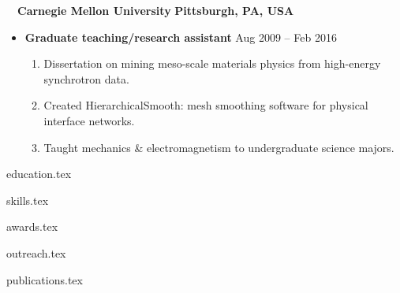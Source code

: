 \documentclass[10.5pt]{article}
\begin{document}
~~{\color{black}\textbf{Carnegie Mellon University} \hfill  \textbf{Pittsburgh, PA, USA}}\par
\begin{itemize}
    \item
        \textbf{Graduate teaching/research assistant}
        \hfill  {Aug 2009 -- Feb 2016} \par
        \begin{enumerate}
            \item Dissertation on mining meso-scale materials physics from high-energy synchrotron data.
            \item Created HierarchicalSmooth: mesh smoothing software for physical interface networks. 
            \item Taught mechanics \& electromagnetism to undergraduate science majors.
        \end{enumerate}
\end{itemize} 


{education.tex}

{skills.tex}

{awards.tex}

{outreach.tex}

{publications.tex}
\end{document}
